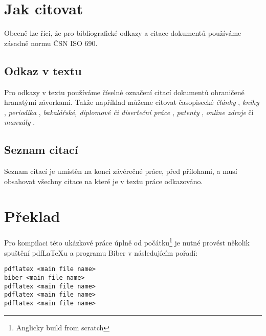 \section{Jak citovat}
Obecně lze říci, že pro bibliografické odkazy a citace dokumentů používáme zásadně normu ČSN ISO 690.
\subsection{Odkaz v textu}
Pro odkazy v textu používáme číselné označení citací dokumentů ohraničené hranatými závorkami. Takže například můžeme citovat časopisecké \emph{články} \cite{herrmann, bertram, moore, yoon, sigfridsson, baez/article}, \emph{knihy} \cite{wilde, nietzsche:ksa1, averroes/bland, hammond, cotton, knuth:ct:a, gerhardt, gonzalez, companion}, \emph{periodika} \cite{jcg}, \emph{bakalářské, diplomové či diserteční práce} \cite{geer}, \emph{patenty} \cite{kowalik, almendro, sorace, laufenberg}, \emph{online zdroje} \cite{ctan, wassenberg, itzhaki, markey, baez/online} či \emph{manuály} \cite{cms}.

\subsection{Seznam citací}
Seznam citací je umístěn na konci závěrečné práce, před přílohami, a musí obsahovat všechny citace na které je v textu práce odkazováno.  

\section{Překlad}
Pro kompilaci této ukázkové práce úplně od počátku\footnote{Anglicky build from scratch} je nutné provést několik spuštění pdf\LaTeX{}u a programu Biber v následujícím pořadí:
\begin{verbatim}
pdflatex <main file name>
biber <main file name>
pdflatex <main file name>
pdflatex <main file name>
pdflatex <main file name>
\end{verbatim}
\endinput
